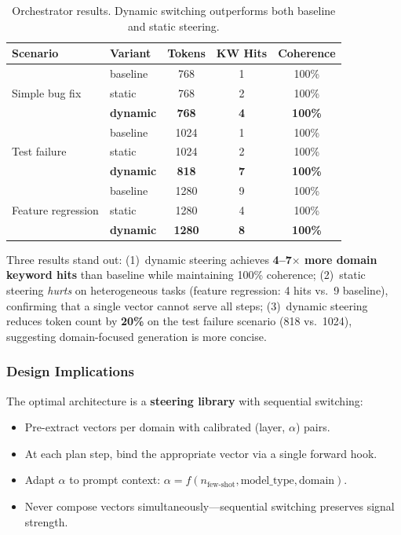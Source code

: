 \documentclass[11pt,a4paper]{article}
\begin{document}
\begin{table}[H]
\centering
\caption{Orchestrator results. Dynamic switching outperforms both baseline and static steering.}
\label{tab:orchestrator}
\small
\begin{tabular}{llccc}
\toprule
\textbf{Scenario} & \textbf{Variant} & \textbf{Tokens} & \textbf{KW Hits} & \textbf{Coherence} \\
\midrule
\multirow{3}{*}{Simple bug fix} & baseline & 768 & 1 & 100\% \\
& static & 768 & 2 & 100\% \\
& \textbf{dynamic} & \textbf{768} & \textbf{4} & \textbf{100\%} \\
\midrule
\multirow{3}{*}{Test failure} & baseline & 1024 & 1 & 100\% \\
& static & 1024 & 2 & 100\% \\
& \textbf{dynamic} & \textbf{818} & \textbf{7} & \textbf{100\%} \\
\midrule
\multirow{3}{*}{Feature regression} & baseline & 1280 & 9 & 100\% \\
& static & 1280 & 4 & 100\% \\
& \textbf{dynamic} & \textbf{1280} & \textbf{8} & \textbf{100\%} \\
\bottomrule
\end{tabular}
\end{table}

Three results stand out: (1)~dynamic steering achieves \textbf{4--7$\times$ more domain keyword hits} than baseline while maintaining 100\% coherence; (2)~static steering \textit{hurts} on heterogeneous tasks (feature regression: 4 hits vs.\ 9 baseline), confirming that a single vector cannot serve all steps; (3)~dynamic steering reduces token count by \textbf{20\%} on the test failure scenario (818 vs.\ 1024), suggesting domain-focused generation is more concise.

\subsubsection{Design Implications}

The optimal architecture is a \textbf{steering library} with sequential switching:
\begin{itemize}
    \item Pre-extract vectors per domain with calibrated (layer, $\alpha$) pairs.
    \item At each plan step, bind the appropriate vector via a single forward hook.
    \item Adapt $\alpha$ to prompt context: $\alpha = f(n_{\text{few-shot}}, \text{model\_type}, \text{domain})$.
    \item Never compose vectors simultaneously---sequential switching preserves signal strength.
\end{itemize}
\end{document}
